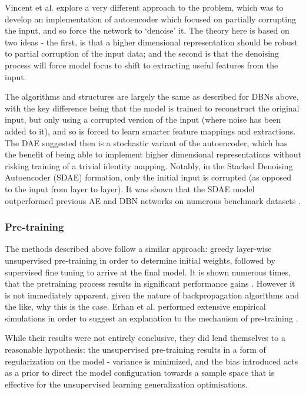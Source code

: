 \documentclass[a4paper,latin]{paper}
\begin{document}
Vincent et al. explore a very different approach to the problem, which was to develop an implementation of 
autoencoder which focused on partially corrupting the input, and so force the network to ‘denoise’ it. The theory 
here is based on two ideas - the first, is that a higher dimensional representation should be robust to partial 
corruption of the input data; and the second is that the denoising process will force model focus to shift to 
extracting useful features from the input.
 \hfill \break 

The algorithms and structures are largely the same as described for DBNs above, with the key difference 
being that the model is trained to reconstruct the original input, but only using a corrupted version of the input 
(where noise has been added to it), and so is forced to learn smarter feature mappings and extractions. 
The DAE suggested then is a stochastic variant of the autoencoder, which has the benefit of being able to 
implement higher dimensional representations without risking training of a trivial identity mapping. Notably, 
in the Stacked Denoising Autoencoder (SDAE) formation, only the initial input is corrupted (as opposed to the 
input from layer to layer). It was shown that the SDAE model outperformed previous AE and DBN networks on 
numerous benchmark datasets \cite{Vincent} . 

\subsubsection {Pre-training}

The methods described above follow a similar approach: greedy layer-wise unsupervised pre-training in order to 
determine initial weights, followed by supervised fine tuning to arrive at the final model. It is shown numerous times, 
that the pretraining process results in significant performance gains \cite{Vincent}. However it is not immediately apparent, 
given the nature of backpropagation algorithms and the like, why this is the case. Erhan et al. performed 
extensive empirical simulations in order to suggest an explanation to the mechanism of pre-training \cite{Erhan}.
 \hfill \break 

While their results were not entirely conclusive, they did lend themselves to a reasonable hypothesis: 
the unsupervised pre-training results in a form of regularization on the model - variance is minimized, and the 
bias introduced acts as a prior to direct the model configuration towards a sample space that is effective for the unsupervised 
learning generalization optimisations.
\end{document}
